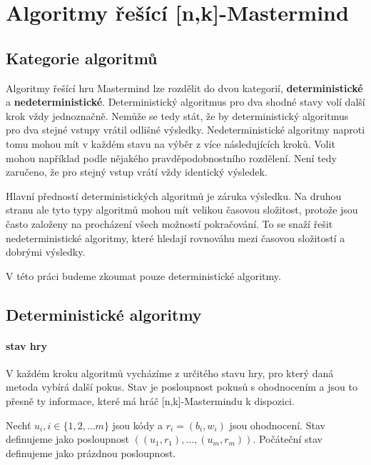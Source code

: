 \chapter{Algoritmy řešící [n,k]-Mastermind}

\section{Kategorie algoritmů}
Algoritmy řešící hru Mastermind lze rozdělit do dvou kategorií, \textbf{deterministické} a \textbf{nedeterministické}. Deterministický algoritmus pro dva shodné stavy volí další krok vždy jednoznačně. Nemůže se tedy stát, že by deterministický algoritmus pro dva stejné vstupy vrátil odlišné výsledky. Nedeterministické algoritmy naproti tomu mohou mít v každém stavu na výběr z více následujících kroků. Volit mohou například podle nějakého pravděpodobnostního rozdělení. Není tedy zaručeno, že pro stejný vstup vrátí vždy identický výsledek.

Hlavní předností deterministických algoritmů je záruka výsledku. Na druhou stranu ale tyto typy algoritmů mohou mít velikou časovou složitost, protože jsou často založeny na procházení všech možností pokračování. To se snaží řešit nedeterministické algoritmy, které hledají rovnováhu mezi časovou složitostí a dobrými výsledky. 

V této práci budeme zkoumat pouze deterministické algoritmy. 



\section{Deterministické algoritmy}

\subsubsection{stav hry}
V každém kroku algoritmů vycházíme z určitého stavu hry, pro který daná metoda vybírá další pokus. Stav je posloupnost pokusů s ohodnocením a jsou to přesně ty informace, které má hráč [n,k]-Mastermindu k dispozici.

\begin{definice}[Stav]\label{stav}
   Nechť $u_i, i\in \{1,2,\dots m\}$ jsou kódy a $r_i = (b_i,w_i)$ jsou ohodnocení. Stav definujeme jako posloupnost $((u_1, r_1), \dots, (u_m, r_m))$. Počáteční stav definujeme jako prázdnou posloupnost.
\end{definice}

